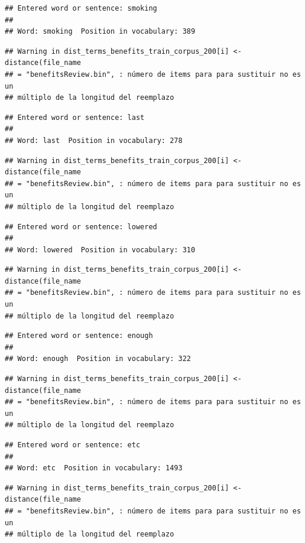 \documentclass[spanish,]{article}
\begin{document}
\begin{verbatim}
## Entered word or sentence: smoking
## 
## Word: smoking  Position in vocabulary: 389
\end{verbatim}

\begin{verbatim}
## Warning in dist_terms_benefits_train_corpus_200[i] <- distance(file_name
## = "benefitsReview.bin", : número de items para para sustituir no es un
## múltiplo de la longitud del reemplazo
\end{verbatim}

\begin{verbatim}
## Entered word or sentence: last
## 
## Word: last  Position in vocabulary: 278
\end{verbatim}

\begin{verbatim}
## Warning in dist_terms_benefits_train_corpus_200[i] <- distance(file_name
## = "benefitsReview.bin", : número de items para para sustituir no es un
## múltiplo de la longitud del reemplazo
\end{verbatim}

\begin{verbatim}
## Entered word or sentence: lowered
## 
## Word: lowered  Position in vocabulary: 310
\end{verbatim}

\begin{verbatim}
## Warning in dist_terms_benefits_train_corpus_200[i] <- distance(file_name
## = "benefitsReview.bin", : número de items para para sustituir no es un
## múltiplo de la longitud del reemplazo
\end{verbatim}

\begin{verbatim}
## Entered word or sentence: enough
## 
## Word: enough  Position in vocabulary: 322
\end{verbatim}

\begin{verbatim}
## Warning in dist_terms_benefits_train_corpus_200[i] <- distance(file_name
## = "benefitsReview.bin", : número de items para para sustituir no es un
## múltiplo de la longitud del reemplazo
\end{verbatim}

\begin{verbatim}
## Entered word or sentence: etc
## 
## Word: etc  Position in vocabulary: 1493
\end{verbatim}

\begin{verbatim}
## Warning in dist_terms_benefits_train_corpus_200[i] <- distance(file_name
## = "benefitsReview.bin", : número de items para para sustituir no es un
## múltiplo de la longitud del reemplazo
\end{verbatim}
\end{document}
